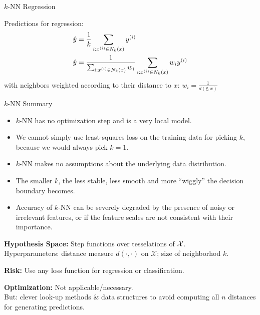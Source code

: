 \documentclass[11pt,compress,t,notes=noshow, xcolor=table]{beamer}
\begin{document}
\begin{frame}{$k$-NN Regression}

Predictions for regression:
\begin{align*}
\hat{y} &= \frac{1}{k} \sum_{i: x^{(i)} \in N_k(x)} y^{(i)}\\
\hat{y} &= \frac{1}{\sum_{i: x^{(i)} \in N_k(x)} w_i} \sum_{i: x^{(i)} \in N_k(x)} w_i y^{(i)}
\end{align*}
with neighbors weighted according to their distance to $x$: $w_i = \frac{1}{d(\xi, x)}$

\end{frame}

\begin{vbframe}{$k$-NN Summary}

\begin{itemize}
\item $k$-NN has no optimization step and is a very local model.
\item We cannot simply use least-squares loss on the training data for picking $k$,
  because we would always pick $k=1$.
\item $k$-NN makes no assumptions about the underlying data distribution.
\item The smaller $k$, the less stable, less smooth and more \enquote{wiggly} the decision
  boundary becomes.
\item Accuracy of $k$-NN can be severely degraded by the presence of noisy or irrelevant features,
  or if the feature scales are not consistent with their importance.
\end{itemize}


\framebreak

\lz

\textbf{Hypothesis Space:} Step functions over tesselations of $\mathcal{X}$.\\
Hyperparameters: distance measure $d(\cdot,\cdot)$ on $\mathcal X$; size of neighborhod $k$.

\lz

\textbf{Risk:} Use any loss function for regression or classification.

\lz

\textbf{Optimization:} Not applicable/necessary.\\ But: clever look-up methods \& data structures to avoid computing all $n$ distances for generating predictions.

\end{vbframe}

\endlecture
\end{document}
